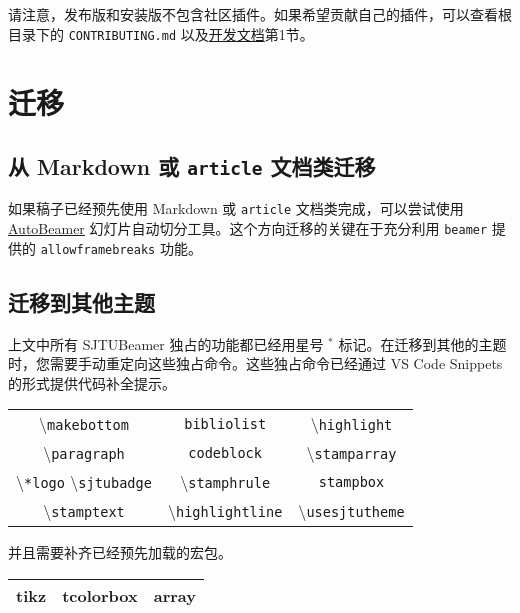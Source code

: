 \documentclass[
    UTF8,
    heading=true,
    12pt,
    a4paper
]{ctexrep}
\newcommand{\cmd}[1]{\textbackslash{}\texttt{#1}}
\newcommand{\cls}[1]{\texttt{#1}}
\newcommand{\env}[1]{\texttt{#1}}
\newcommand{\opt}[1]{\texttt{#1}}
\def\themename{\textsf{SJTUBeamer}}
\begin{document}
请注意，发布版和安装版不包含社区插件。如果希望贡献自己的插件，可以查看根目录下的 \verb"CONTRIBUTING.md" 以及\href{run:sjtubeamerdevguide.pdf}{开发文档}第1节。


\chapter{迁移}

\section{从 Markdown 或 \cls{article} 文档类迁移}

如果稿子已经预先使用 Markdown 或 \cls{article} 文档类完成，可以尝试使用 \href{https://logcreative.github.io/AutoBeamer/}{AutoBeamer} 幻灯片自动切分工具。这个方向迁移的关键在于充分利用 \cls{beamer} 提供的 \opt{allowframebreaks} 功能。

\section{迁移到其他主题}

上文中所有 \themename{} 独占的功能都已经用星号 $^*$ 标记。在迁移到其他的主题时，您需要手动重定向这些独占命令。这些独占命令已经通过 VS Code Snippets 的形式提供代码补全提示。

\begin{table}[h]
  \centering
  \begin{tabular}{ccc}
    \hline
    \cmd{makebottom}            & \env{bibliolist}    & \cmd{highlight}    \\
    \cmd{paragraph}             & \env{codeblock}     & \cmd{stamparray}   \\
    \cmd{*logo} \cmd{sjtubadge} & \cmd{stamphrule}    & \env{stampbox}     \\
    \cmd{stamptext}             & \cmd{highlightline} & \cmd{usesjtutheme} \\
    \hline
  \end{tabular}
\end{table}

并且需要补齐已经预先加载的宏包。

\begin{table}[h]
  \centering
  \begin{tabular}{>{\sffamily}c>{\sffamily}c>{\sffamily}c}
    \hline
    tikz & tcolorbox & array \\
    \hline
  \end{tabular}
\end{table}
\end{document}
